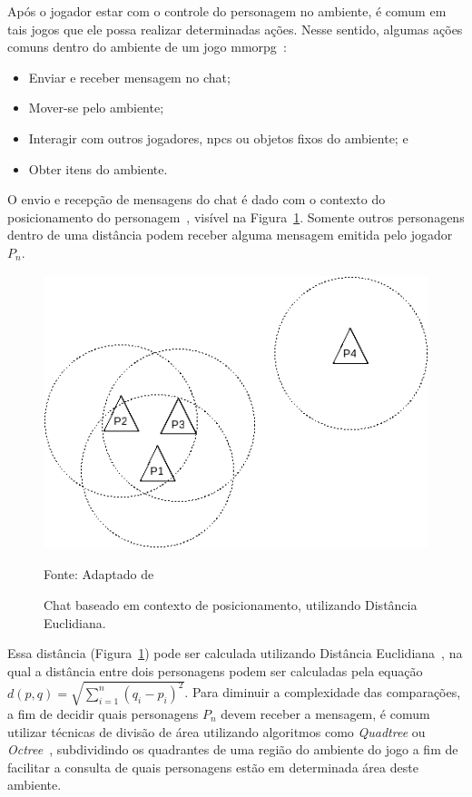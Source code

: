 Após o jogador estar com o controle do personagem no ambiente, é comum em tais jogos que ele possa realizar determinadas ações.
%
Nesse sentido, algumas ações comuns dentro do ambiente de um jogo \ac{mmorpg}~\cite{mmorpg_culture}:

\begin{itemize}
  \item Enviar e receber mensagem no chat;
  \item Mover-se pelo ambiente;
  \item Interagir com outros jogadores, \acp{npc} ou objetos fixos do ambiente; e
  \item Obter itens do ambiente.
\end{itemize}



O envio e recepção de mensagens do chat é dado com o contexto do posicionamento do personagem~\cite{albion_online_unite}, visível na Figura~\ref{fig:chat}.
%
Somente outros personagens dentro de uma distância podem receber alguma mensagem emitida pelo jogador $P_n$.

\begin{figure}[htb!]
\caption{Chat baseado em contexto de posicionamento, utilizando Distância Euclidiana.}
\label{fig:chat}
\includegraphics[height=8cm]{img/cap2/chat.png}
\centering

Fonte: Adaptado de ~\cite{albion_online_unite}
\end{figure}

Essa distância (Figura~\ref{fig:chat}) pode ser calculada utilizando Distância Euclidiana~\cite{Deza2009Aug}, na qual a distância entre dois personagens podem ser calculadas pela equação $d(p, q) = \sqrt{\sum_{i=1}^{n}(q_i - p_i)^2}$.
%
Para diminuir a complexidade das comparações, a fim de decidir quais personagens $P_n$ devem receber a mensagem, é comum utilizar técnicas de divisão de área utilizando algoritmos como \textit{Quadtree} ou \textit{Octree}~\cite{Lengyel2011Jun}, subdividindo os quadrantes de uma região do ambiente do jogo a fim de facilitar a consulta de quais personagens estão em determinada área deste ambiente.


